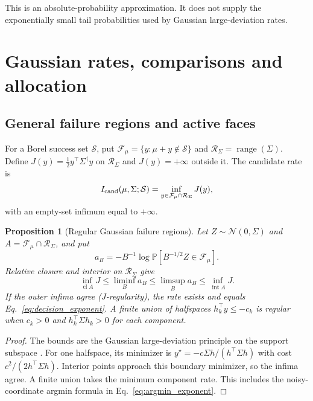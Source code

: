 \documentclass[a4paper,onecolumn,unpublished,nopdfoutputerror]{quantumarticle}
\theoremstyle{plain}
\newtheorem{proposition}[theorem]{Proposition}
\theoremstyle{definition}
\newcommand{\Prob}{\mathbb{P}}
\newcommand{\calR}{\mathcal{R}}
\newcommand{\calS}{\mathcal{S}}
\newcommand{\calF}{\mathcal{F}}
\newcommand{\calN}{\mathcal{N}}
\newcommand{\cl}{\operatorname{cl}}
\newcommand{\interior}{\operatorname{int}}
\newcommand{\1}{\mathbf{1}}
\begin{document}
This is an absolute-probability approximation. It does not supply the exponentially small tail probabilities used by Gaussian large-deviation rates.

\section{Gaussian rates, comparisons and allocation}
\label{app:gaussian_proofs}

\subsection{General failure regions and active faces}
For a Borel success set $\calS$, put $\calF_\mu=\{y:\mu+y\notin\calS\}$ and $\calR_\Sigma=\operatorname{range}(\Sigma)$. Define $J(y)=\tfrac12 y^\top\Sigma^\dagger y$ on $\calR_\Sigma$ and $J(y)=+\infty$ outside it. The candidate rate is
\begin{equation}\label{eq:decision_exponent}
I_{\rm cand}(\mu,\Sigma;\calS)=\inf_{y\in\calF_\mu\cap\calR_\Sigma}J(y),
\end{equation}
with an empty-set infimum equal to $+\infty$.

\begin{proposition}[Regular Gaussian failure regions]
\label{prop:general_gaussian_rate}\label{lem:jregularity}
Let $Z\sim\calN(0,\Sigma)$ and $A=\calF_\mu\cap\calR_\Sigma$, and put
\[
a_B=-B^{-1}\log\Prob[B^{-1/2}Z\in\calF_\mu].
\]
Relative closure and interior on $\calR_\Sigma$ give
\begin{equation}
\inf_{\cl A}J\le\liminf_B a_B\le\limsup_B a_B\le\inf_{\interior A}J.
\end{equation}
If the outer infima agree ($J$-regularity), the rate exists and equals Eq.~\eqref{eq:decision_exponent}. A finite union of halfspaces $h_k^\top y\le-c_k$ is regular when $c_k>0$ and $h_k^\top\Sigma h_k>0$ for each component.
\end{proposition}

\begin{proof}
The bounds are the Gaussian large-deviation principle on the support subspace \cite{DemboZeitouni1998}. For one halfspace, its minimizer is $y^\star=-c\Sigma h/(h^\top\Sigma h)$ with cost $c^2/(2h^\top\Sigma h)$. Interior points approach this boundary minimizer, so the infima agree. A finite union takes the minimum component rate. This includes the noisy-coordinate argmin formula in Eq.~\eqref{eq:argmin_exponent}.
\end{proof}
\end{document}
